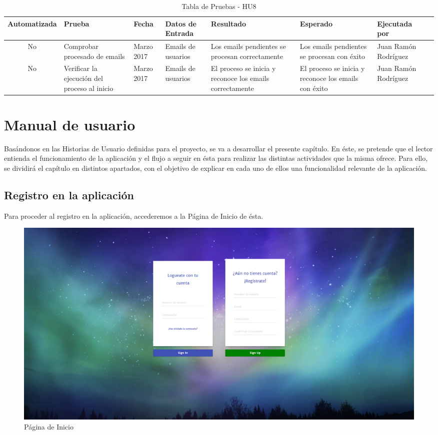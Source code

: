 \documentclass[11pt,openany]{book}
\begin{document}
{\tiny
\setlength{\LTleft}{-20cm plus -1fill}
\setlength{\LTright}{\LTleft}
\begin{center}
\begin{longtable}{| c | M{1.5cm} | M{1.5cm} | M{2.5cm} | M{1.5cm} | M{1.5cm} | M{1.5cm} | M{1.5cm} |}
\caption[Tabla de Pruebas - HU8]{Tabla de Pruebas - HU8} \label{grid_mlmmh} \\

\hline Automatizada & Prueba & Fecha & Datos de Entrada & Resultado & Esperado & Ejecutada por \\
\endfirsthead
\hline
No & Comprobar procesado de emails & Marzo 2017 & Emails de usuarios & Los emails pendientes se procesan correctamente & Los emails pendientes se procesan con éxito & Juan Ramón Rodríguez \\
\hline
No & Verificar la ejecución del proceso al inicio & Marzo 2017 & Emails de usuarios & El proceso se inicia y reconoce los emails correctamente & El proceso se inicia y reconoce los emails con éxito & Juan Ramón Rodríguez \\
\hline
\end{longtable}
\end{center}}

\chapter{Manual de usuario}

Basándonos en las Historias de Usuario definidas para el proyecto, se va a desarrollar el presente capítulo. En éste, se pretende que el lector entienda el funcionamiento de la aplicación y el flujo a seguir en ésta para realizar las distintas actividades que la misma ofrece. Para ello, se dividirá el capítulo en distintos apartados, con el objetivo de explicar en cada uno de ellos una funcionalidad relevante de la aplicación.

\pagebreak
\section{Registro en la aplicación}

Para proceder al registro en la aplicación, accederemos a la Página de Inicio de ésta.

\begin{figure}[H]
\centering
\includegraphics[totalheight=6cm]{manualUsuario/paginaInicio.png}
\caption{Página de Inicio}
\end{figure}
\end{document}
